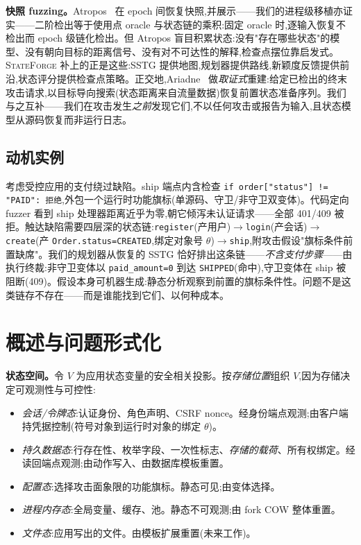 \documentclass[letterpaper,twocolumn,10pt]{article}
\newcommand{\sys}{\textsc{StateForge}}
\begin{document}
\textbf{快照 fuzzing。}Atropos~\cite{atropos} 在 epoch 间恢复快照,并展示——我们的进程级移植亦证实——二阶检出等于使用点 oracle 与状态链的乘积:固定 oracle 时,逐输入恢复不检出而 epoch 级链化检出。但 Atropos 盲目积累状态:没有"存在哪些状态"的模型、没有朝向目标的距离信号、没有对不可达性的解释,检查点摆位靠启发式。\sys{} 补上的正是这些:SSTG 提供地图,规划器提供路线,新颖度反馈提供前沿,状态评分提供检查点策略。正交地,Ariadne~\cite{ariadne} 做\emph{取证式}重建:给定已检出的终末攻击请求,以目标导向搜索(状态距离来自流量数据)恢复前置状态准备序列。我们与之互补——我们在攻击发生\emph{之前}发现它们,不以任何攻击或报告为输入,且状态模型从源码恢复而非运行日志。

\subsection{动机实例}
考虑受控应用的支付绕过缺陷。ship 端点内含检查 \texttt{if order["status"] != "PAID": 拒绝},外包一个运行时功能旗标(单源码、守卫/非守卫双变体)。代码定向 fuzzer 看到 ship 处理器距离近乎为零,朝它倾泻未认证请求——全部 401/409 被拒。触达缺陷需要四层深的状态链:\texttt{register}(产用户)$\to$\texttt{login}(产会话)$\to$\texttt{create}(产 \texttt{Order.status=CREATED},绑定对象号 $\theta$)$\to$\texttt{ship},附攻击假设"旗标条件前置缺席"。我们的规划器从恢复的 SSTG 恰好排出这条链——\emph{不含支付步骤}——由执行终裁:非守卫变体以 \texttt{paid\_amount=0} 到达 \texttt{SHIPPED}(命中),守卫变体在 ship 被阻断(409)。假设本身可机器生成:静态分析观察到前置的旗标条件性。问题不是这类链存不存在——而是谁能找到它们、以何种成本。

\section{概述与问题形式化}
\label{sec:formulation}

\textbf{状态空间。}令 $V$ 为应用状态变量的安全相关投影。按\emph{存储位置}组织 $V$,因为存储决定可观测性与可控性:

\begin{itemize}
\item[(i)] \emph{会话/令牌态}:认证身份、角色声明、CSRF nonce。经身份端点观测;由客户端持凭据控制(符号对象到运行时对象的绑定 $\theta$)。
\item[(ii)] \emph{持久数据态}:行存在性、枚举字段、一次性标志、\emph{存储的载荷}、所有权绑定。经读回端点观测;由动作写入、由数据库模板重置。
\item[(iii)] \emph{配置态}:选择攻击面象限的功能旗标。静态可见;由变体选择。
\item[(iv)] \emph{进程内存态}:全局变量、缓存、池。静态不可观测;由 fork COW 整体重置。
\item[(v)] \emph{文件态}:应用写出的文件。由模板扩展重置(未来工作)。
\end{itemize}
\end{document}
